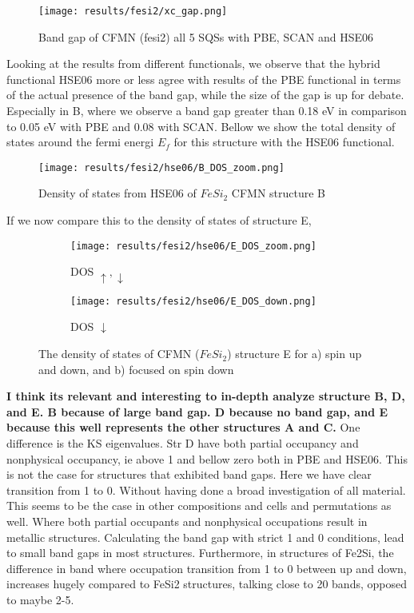 \begin{figure}[H]
\centering
\texttt{[image: results/fesi2/xc\_gap.png]}
\caption{Band gap of CFMN (fesi2) all 5 SQSs with PBE, SCAN and HSE06}
\label{Xc_fig}
\end{figure}


Looking at the results from different functionals, we observe that the hybrid functional HSE06 more or less agree with results of the PBE functional in terms of the actual presence of the band gap, while the size of the gap is up for debate. Especially in B, where we observe a band gap greater than 0.18 eV in comparison to 0.05 eV with PBE and 0.08 with SCAN. Bellow we show the total density of states around the fermi energi $E_f$ for this structure with the HSE06 functional. 

\begin{figure}[H]
\centering
\texttt{[image: results/fesi2/hse06/B\_DOS\_zoom.png]}
\caption{Density of states from HSE06 of $FeSi_2$ CFMN structure B}
\label{DOS_hse06_B}
\end{figure}

If we now compare this to the density of states of structure E,

\begin{figure}[H]
\begin{subfigure}{0.5\textwidth}
\texttt{[image: results/fesi2/hse06/E\_DOS\_zoom.png]}
\caption{DOS $\uparrow, \downarrow$}
\end{subfigure}
\hfill
\begin{subfigure}{0.5\textwidth}
\texttt{[image: results/fesi2/hse06/E\_DOS\_down.png]}
\caption{DOS $\downarrow$}
\end{subfigure}
\caption{The density of states of CFMN ($FeSi_2$) structure E for a) spin up and down, and b) focused on spin down}
\end{figure}


\textbf{I think its relevant and interesting to in-depth analyze structure B, D, and E. B because of large band gap. D because no band gap, and E because this well represents the other structures A and C. }
One difference is the KS eigenvalues. Str D have both partial occupancy and nonphysical occupancy, ie above 1 and bellow zero both in PBE and HSE06. This is not the case for structures that exhibited band gaps. Here we have clear transition from 1 to 0. Without having done a broad investigation of all material. This seems to be the case in other compositions and cells and permutations as well. Where both partial occupants and nonphysical occupations result in metallic structures. Calculating the band gap with strict 1 and 0 conditions, lead to small band gaps in most structures. Furthermore, in structures of Fe2Si, the difference in band where occupation transition from 1 to 0 between up and down, increases hugely compared to FeSi2 structures, talking close to 20 bands, opposed to maybe 2-5. 
